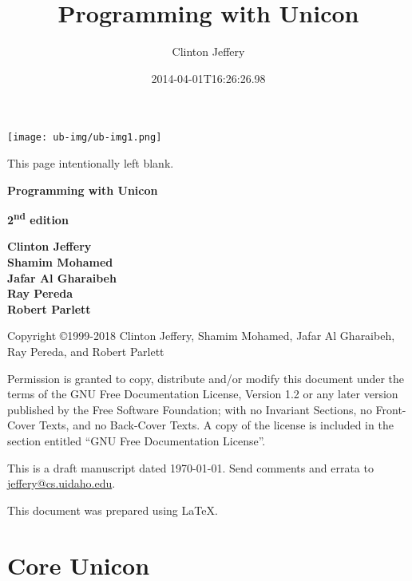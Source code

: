 \documentclass[letterpaper,twoside,12pt]{book}
\title{Programming with Unicon}
\author{Clinton Jeffery}
\date{2014-04-01T16:26:26.98}
\begin{document}
\thispagestyle{empty}
\setlength{\topmargin}{-0.05in}
\hspace{-0.5in}
\texttt{[image: ub-img/ub-img1.png]}
\clearpage

\bigskip
This page intentionally left blank.
\clearpage

\vspace*{3\bigskipamount}
\begin{center}
  \bfseries\Huge
  Programming with Unicon
\end{center}
\bigskip
\bigskip
\begin{center}
  \bfseries\huge
  2\textsuperscript{nd} edition
\end{center}
\vspace*{7\bigskipamount}
\begin{flushright}\bfseries
Clinton Jeffery \\
Shamim Mohamed \\
Jafar Al Gharaibeh \\
Ray Pereda \\
Robert Parlett 
\end{flushright}
\clearpage

\thispagestyle{empty}
\bigskip
\bigskip
Copyright \copyright 1999-2018 Clinton Jeffery, Shamim Mohamed,
Jafar Al Gharaibeh, Ray Pereda, and Robert Parlett

Permission is granted to copy, distribute and/or modify this document under the
terms of the GNU Free Documentation License, Version 1.2 or any later version
published by the Free Software Foundation; with no Invariant Sections, no
Front-Cover Texts, and no Back-Cover Texts. A copy of the license is included in
the section entitled ``GNU Free Documentation License''.
\bigskip


This is a draft manuscript dated \today.  Send comments and errata
to \linebreak \href{mailto:jeffery@cs.uidaho.edu}{jeffery@cs.uidaho.edu}.

\bigskip
This document was prepared using \LaTeX.
\clearpage

\frontmatter
\setcounter{tocdepth}{2}
\tableofcontents


\mainmatter



\part{Core Unicon}
\end{document}
